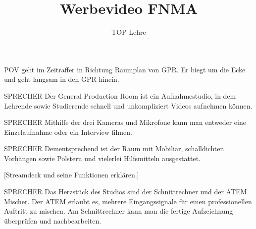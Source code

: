 \documentclass{screenplay}
\title{Werbevideo FNMA}
\author{TOP Lehre}
\begin{document}
	\coverpage
	\fadein
	
	
	POV geht im Zeitraffer in Richtung Raumplan von GPR. Er biegt um die Ecke und geht langsam in den GPR hinein.
	
	\begin{dialogue}{SPRECHER}
		Der General Production Room ist ein Aufnahmestudio, in dem Lehrende sowie Studierende schnell und unkompliziert Videos aufnehmen können.
	\end{dialogue}
	
	
	\begin{dialogue}{SPRECHER}
		Mithilfe der drei Kameras und Mikrofone kann man entweder eine Einzelaufnahme oder ein Interview filmen.
	\end{dialogue}
	
	\begin{dialogue}{SPRECHER}
		Dementsprechend ist der Raum mit Mobiliar, schalldichten Vorhängen sowie Polstern und vielerlei Hilfsmitteln ausgestattet.
	\end{dialogue}
	
	[Streamdeck und seine Funktionen erklären.]
	
	\begin{dialogue}{SPRECHER}
		Das Herzstück des Studios sind der Schnittrechner und der ATEM Mischer. Der ATEM erlaubt es, mehrere Eingangssignale für einen professionellen Auftritt zu mischen. Am Schnittrechner kann man die fertige Aufzeichnung überprüfen und nachbearbeiten.
	\end{dialogue}
	
	\fadeout
	\theend
\end{document}
